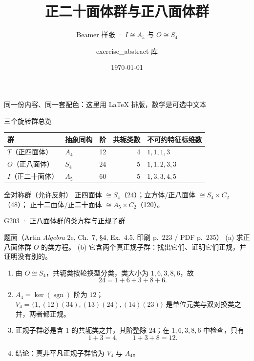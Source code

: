\documentclass[aspectratio=169,10pt,fontset=none]{ctexbeamer}
\title{正二十面体群与正八面体群}
\subtitle{Beamer 样张 \;·\; $I\cong A_5$ 与 $O\cong S_4$}
\author{exercise\_abstract 库}
\date{\today}
\begin{document}
\begin{frame}[plain]
  \titlepage
  \begin{center}
    \small 同一份内容、同一套配色：这里用 \LaTeX{} 排版，数学是可选中文本
  \end{center}
\end{frame}

\begin{frame}[t]{三个旋转群总览}
  \begin{table}
    \centering
    \begin{tabular}{llrrl}
      \toprule
      群 & 抽象同构 & 阶 & 共轭类数 & 不可约特征标维数 \\
      \midrule
      $T$（正四面体）   & $A_4$ & 12 & 4 & $1,1,1,3$ \\
      $O$（正八面体）   & $S_4$ & 24 & 5 & $1,1,2,3,3$ \\
      $I$（正二十面体） & $A_5$ & 60 & 5 & $1,3,3,4,5$ \\
      \bottomrule
    \end{tabular}
  \end{table}
  \vspace{0.4em}
  \begin{alertblock}{全对称群（允许反射）}
    正四面体 $\cong S_4$（24）；立方体/正八面体 $\cong S_4\times C_2$（48）；
    正十二面体/正二十面体 $\cong A_5\times C_2$（120）。
  \end{alertblock}
\end{frame}

\begin{frame}[t]{G203 · 正八面体群的类方程与正规子群}
  \begin{block}{题面（Artin \textit{Algebra} 2e, Ch.~7, §4, Ex.~4.5, 印刷 p.~223 / PDF p.~235）}
    (a) 求正八面体群 $O$ 的类方程。\quad
    (b) 它含两个真正规子群：找出它们、证明它们正规，并证明没有别的。
  \end{block}
  \vspace{0.2em}
  \begin{enumerate}[<+->]
    \item 由 $O\cong S_4$，共轭类按轮换型分类，类大小为 $1,6,3,8,6$，故
      \[ 24=1+6+3+8+6. \]
    \item $A_4=\ker(\operatorname{sgn})$ 阶为 $12$；$V_4=\{1,(12)(34),(13)(24),(14)(23)\}$ 是单位元类与双对换类之并，两者都正规。
    \item 正规子群必是含 $1$ 的共轭类之并，其阶整除 $24$；在 $1,6,3,8,6$ 中检查，只有
      \[ 1+3=4,\qquad 1+3+8=12. \]
    \item \alert{结论}：真非平凡正规子群恰为 $V_4$ 与 $A_4$。
  \end{enumerate}
\end{frame}
\end{document}
